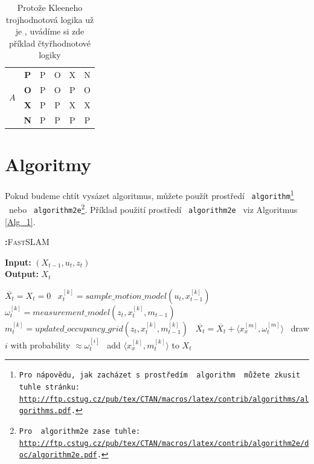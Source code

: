 \documentclass[11pt,a4paper]{article}
\begin{document}
\begin{table}[h]
\begin{center}
\begin{tabular}{|c|c|c|c|c|c|}
\multirow{4}{*}{$A$} & \textbf{P} & P & O & X & N \\ \cline{2-6}
\multirow{4}{*}{} & \textbf{O} & P & O & P & O \\ \cline{2-6}
\multirow{4}{*}{} & \textbf{X} & P & P & X & X \\ \cline{2-6}
\multirow{4}{*}{} & \textbf{N} & P & P & P & P \\ \hline
\end{tabular}
\caption{Protože Kleeneho trojhodnotová logika už je , uvádíme si zde příklad čtyřhodnotové \\\hspace{1cm} logiky}
\label{tab_2}
\end{center}
\end{table}

\pagebreak

\section{Algoritmy}
\label{Algoritmy}

Pokud budeme chtít vysázet algoritmus, můžete použít prostředí \  \texttt{algorithm\footnote{Pro nápovědu, jak zacházet s prostředím \ \texttt{algorithm} \ můžete zkusit tuhle stránku: \hfill \\ \url{http://ftp.cstug.cz/pub/tex/CTAN/macros/latex/contrib/algorithms/algorithms.pdf}.}} \ nebo \ \texttt{algorithm2e\footnote{Pro \ \texttt{algorithm2e} zase tuhle: \url{http://ftp.cstug.cz/pub/tex/CTAN/macros/latex/contrib/algorithm2e/doc/algorithm2e.pdf}.}}. \linebreak Příklad použití prostředí \ \texttt{algorithm2e} \ viz Algoritmus \ref{Alg_1}. \\

\begin{algorithm}
\caption{\textbf{:}\textsc{Fast}SLAM}\label{alg:cap}
\label{Alg_1}
\textbf{Input:} $(X_{t-1}, u_t, z_t)$ \\
\textbf{Output:} $X_t$
\begin{algorithmic}[1]
\State $\overline{X_t} = X_t = 0$
\State \ $x_{t}^{[k]} = sample\_motion\_model(u_t, x_{t-1}^{[k]})$
\State \ $\omega_{t}^{[k]} = measurement\_model(z_t, x_{t}^{[k]}, m_{t-1})$
\State \ $m_{t}^{[k]} = updated\_occupancy\_grid(z_t, x_{t}^{[k]}, m_{t-1}^{[k]})$
\State \ $\overline{X_t} = \overline{X_t} + \langle x_{x}^{[m]}, \omega_{t}^{[m]} \rangle$
\EndFor
{}
\State \ draw $i$ with probability $\approx \omega_t^{[i]}$
\State \ add $\langle x_x^{[k]}, m_t^{[k]} \rangle$ to $X_t$
\EndFor \\
\end{algorithmic}
\end{algorithm}
\end{document}
